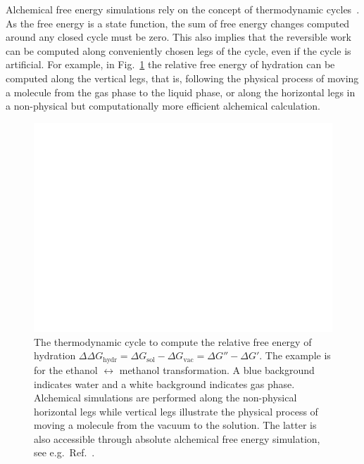 \documentclass[journal=jctcce,manuscript=article]{achemso}
\begin{document}
Alchemical free energy simulations rely on the concept of thermodynamic 
cycles~\cite{Tembe1984281}.
As the free energy is a state function, the sum of free energy changes
computed around any closed cycle must be zero.  This also implies
that the reversible work can be computed along
conveniently chosen legs of the cycle, even if the cycle is artificial.  For example, in
Fig.~\ref{fig:thermocycle} the relative free energy of hydration can
be computed along the vertical legs, that is, following the physical
process of moving a molecule from the gas phase to the liquid phase,
or along the horizontal legs in a non-physical but computationally more
efficient alchemical calculation.

\begin{figure}[ht]
  \includegraphics[scale=1.0]{figures/thermocycle.pdf}
  \caption{The thermodynamic cycle to compute the relative free energy
    of hydration
    $\Delta\Delta G_{\mathrm{hydr}}=\Delta G_{\mathrm{sol}}-\Delta
    G_{\mathrm{vac}}=\Delta G'' - \Delta G'$.  The example is for the
    ethanol $\leftrightarrow$ methanol transformation.  A blue background indicates water and a white background indicates gas phase. Alchemical
    simulations are performed along the non-physical horizontal
    legs while vertical legs illustrate the physical process of moving a 
    molecule from the vacuum to the solution.  The latter is also accessible 
    through absolute alchemical free energy simulation, see e.g.\ 
    Ref.~.}
  \label{fig:thermocycle}
\end{figure}
\end{document}
